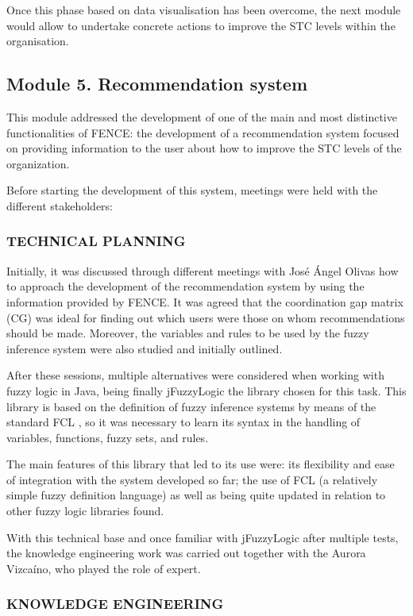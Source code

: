 Once this phase based on data visualisation has been overcome, the next module would allow to undertake concrete actions to improve the STC levels within the organisation.

\subsection{Module 5. Recommendation system}

This module addressed the development of one of the main and most distinctive functionalities of FENCE: the development of a recommendation system focused on providing information to the user about how to improve the STC levels of the organization.

Before starting the development of this system, meetings were held with the different stakeholders:

\subsubsection{TECHNICAL PLANNING}
Initially, it was discussed through different meetings with José Ángel Olivas how to approach the development of the recommendation system by using the information provided by FENCE. It was agreed that the coordination gap matrix (CG) was ideal for finding out which users were those on whom recommendations should be made. Moreover, the variables and rules to be used by the fuzzy inference system were also studied and initially outlined.

After these sessions, multiple alternatives were considered when working with fuzzy logic in Java, being finally jFuzzyLogic \cite{cingolani_jfuzzylogic_2012, cingolani_jfuzzylogic_2013} the library chosen for this task. This library is based on the definition of fuzzy inference systems by means of the standard FCL \cite{FCL}, so it was necessary to learn its syntax in the handling of variables, functions, fuzzy sets, and rules.

The main features of this library that led to its use were: its flexibility and ease of integration with the system developed so far; the use of FCL (a relatively simple fuzzy definition language) as well as being quite updated in relation to other fuzzy logic libraries found.

With this technical base and once familiar with jFuzzyLogic after multiple tests, the knowledge engineering work was carried out together with the Aurora Vizcaíno, who played the role of expert.

\subsubsection{KNOWLEDGE ENGINEERING}

